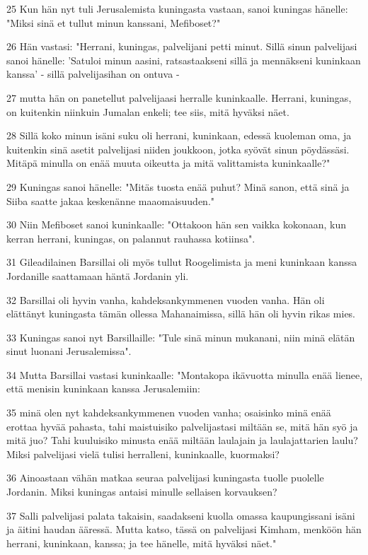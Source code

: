\par 25 Kun hän nyt tuli Jerusalemista kuningasta vastaan, sanoi kuningas hänelle: "Miksi sinä et tullut minun kanssani, Mefiboset?"
\par 26 Hän vastasi: "Herrani, kuningas, palvelijani petti minut. Sillä sinun palvelijasi sanoi hänelle: 'Satuloi minun aasini, ratsastaakseni sillä ja mennäkseni kuninkaan kanssa' - sillä palvelijasihan on ontuva -
\par 27 mutta hän on panetellut palvelijaasi herralle kuninkaalle. Herrani, kuningas, on kuitenkin niinkuin Jumalan enkeli; tee siis, mitä hyväksi näet.
\par 28 Sillä koko minun isäni suku oli herrani, kuninkaan, edessä kuoleman oma, ja kuitenkin sinä asetit palvelijasi niiden joukkoon, jotka syövät sinun pöydässäsi. Mitäpä minulla on enää muuta oikeutta ja mitä valittamista kuninkaalle?"
\par 29 Kuningas sanoi hänelle: "Mitäs tuosta enää puhut? Minä sanon, että sinä ja Siiba saatte jakaa keskenänne maaomaisuuden."
\par 30 Niin Mefiboset sanoi kuninkaalle: "Ottakoon hän sen vaikka kokonaan, kun kerran herrani, kuningas, on palannut rauhassa kotiinsa".
\par 31 Gileadilainen Barsillai oli myös tullut Roogelimista ja meni kuninkaan kanssa Jordanille saattamaan häntä Jordanin yli.
\par 32 Barsillai oli hyvin vanha, kahdeksankymmenen vuoden vanha. Hän oli elättänyt kuningasta tämän ollessa Mahanaimissa, sillä hän oli hyvin rikas mies.
\par 33 Kuningas sanoi nyt Barsillaille: "Tule sinä minun mukanani, niin minä elätän sinut luonani Jerusalemissa".
\par 34 Mutta Barsillai vastasi kuninkaalle: "Montakopa ikävuotta minulla enää lienee, että menisin kuninkaan kanssa Jerusalemiin:
\par 35 minä olen nyt kahdeksankymmenen vuoden vanha; osaisinko minä enää erottaa hyvää pahasta, tahi maistuisiko palvelijastasi miltään se, mitä hän syö ja mitä juo? Tahi kuuluisiko minusta enää miltään laulajain ja laulajattarien laulu? Miksi palvelijasi vielä tulisi herralleni, kuninkaalle, kuormaksi?
\par 36 Ainoastaan vähän matkaa seuraa palvelijasi kuningasta tuolle puolelle Jordanin. Miksi kuningas antaisi minulle sellaisen korvauksen?
\par 37 Salli palvelijasi palata takaisin, saadakseni kuolla omassa kaupungissani isäni ja äitini haudan ääressä. Mutta katso, tässä on palvelijasi Kimham, menköön hän herrani, kuninkaan, kanssa; ja tee hänelle, mitä hyväksi näet."
